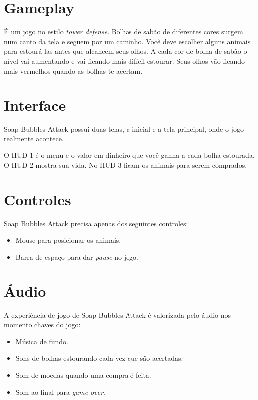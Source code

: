 \documentclass[a4paper,draft,12pt]{article}
\begin{document}
\vfill

\section{Gameplay}

É um jogo no estilo \emph{tower defense}. Bolhas de sabão de diferentes cores surgem num canto da tela e seguem por um caminho. Você deve escolher alguns animais para estourá-las antes que alcancem seus olhos. A cada cor de bolha de sabão o nível vai aumentando e vai ficando mais difícil estourar. Seus olhos vão ficando mais vermelhos quando as bolhas te acertam.

\bigskip
\pagebreak
\section{Interface}
Soap Bubbles Attack possui duas telas, a inicial e a tela principal, onde o jogo realmente acontece.

\vspace{20cm}

O HUD-1 é o menu e o valor em dinheiro que você ganha a cada bolha estourada. O HUD-2 mostra sua vida. No HUD-3 ficam os animais para serem comprados.

\section{Controles}
Soap Bubbles Attack precisa apenas dos seguintes controles:
\begin{itemize}
\item Mouse para posicionar os animais.
\item Barra de espaço para dar \emph{pause} no jogo.
\end{itemize}

\section{Áudio}
A experiência de jogo de Soap Bubbles Attack é valorizada pelo áudio nos momento chaves do jogo:
\begin{itemize}
\item Música de fundo.
\item Sons de bolhas estourando cada vez que são acertadas.
\item Som de moedas quando uma compra é feita.
\item Som ao final para \emph{game over}.
\end{itemize}
\end{document}
